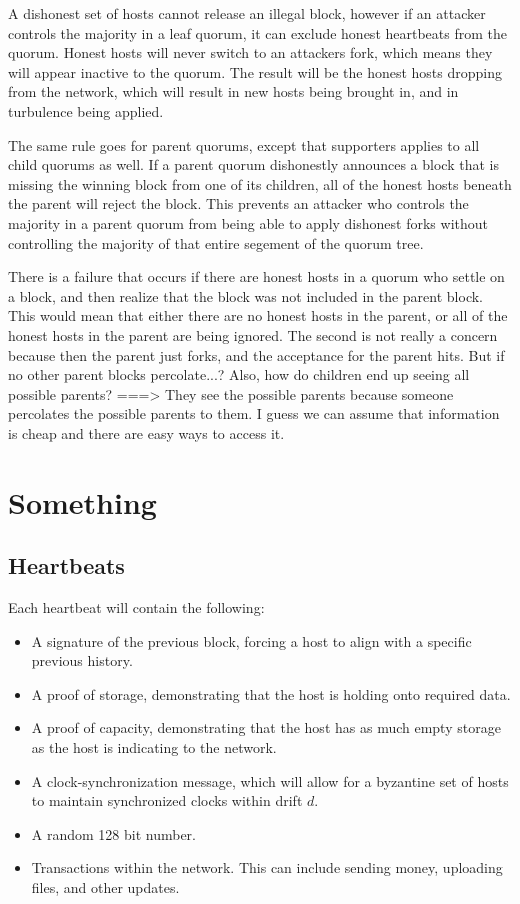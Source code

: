 \documentclass[twocolumn]{article}
\begin{document}
A dishonest set of hosts cannot release an illegal block, however if an attacker controls the majority in a leaf quorum, it can exclude honest heartbeats from the quorum.
Honest hosts will never switch to an attackers fork, which means they will appear inactive to the quorum.
The result will be the honest hosts dropping from the network, which will result in new hosts being brought in, and in turbulence being applied.

The same rule goes for parent quorums, except that supporters applies to all child quorums as well.
If a parent quorum dishonestly announces a block that is missing the winning block from one of its children, all of the honest hosts beneath the parent will reject the block.
This prevents an attacker who controls the majority in a parent quorum from being able to apply dishonest forks without controlling the majority of that entire segement of the quorum tree.

There is a failure that occurs if there are honest hosts in a quorum who settle on a block, and then realize that the block was not included in the parent block.
This would mean that either there are no honest hosts in the parent, or all of the honest hosts in the parent are being ignored.
The second is not really a concern because then the parent just forks, and the acceptance for the parent hits.
But if no other parent blocks percolate...?
Also, how do children end up seeing all possible parents?
===> They see the possible parents because someone percolates the possible parents to them.
I guess we can assume that information is cheap and there are easy ways to access it.

\section{Something}
\subsection{Heartbeats}
Each heartbeat will contain the following:
\begin{itemize}
	\item A signature of the previous block, forcing a host to align with a specific previous history.
	\item A proof of storage, demonstrating that the host is holding onto required data.
	\item A proof of capacity, demonstrating that the host has as much empty storage as the host is indicating to the network.
	\item A clock-synchronization message, which will allow for a byzantine set of hosts to maintain synchronized clocks within drift $d$.
	\item A random 128 bit number.
	\item Transactions within the network. This can include sending money, uploading files, and other updates.
\end{itemize}
\end{document}
